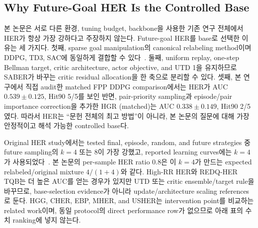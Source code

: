 \documentclass[letterpaper]{article}
\begin{document}
\subsection{Why Future-Goal HER Is the Controlled Base}

본 논문은 서로 다른 환경, tuning budget, backbone을 사용한 기존 연구 전체에서 HER가 항상 가장 강하다고 주장하지 않는다. Future-goal HER를 base로 선택한 이유는 세 가지다. 첫째, sparse goal manipulation의 canonical relabeling method이며 DDPG, TD3, SAC에 동일하게 결합할 수 있다~\citep{andrychowicz2017her}. 둘째, uniform replay, one-step Bellman target, critic architecture, actor objective, and UTD 1을 유지하므로 SABER가 바꾸는 critic residual allocation을 한 축으로 분리할 수 있다. 셋째, 본 연구에서 직접 audit한 matched FPP DDPG comparison에서는 HER가 AUC \(0.539\pm0.125\), Hit90 5/5를 보인 반면, pair-priority sampling과 episode/pair importance correction을 추가한 HGR (matched)는 AUC \(0.338\pm0.149\), Hit90 2/5였다. 따라서 HER는 ``문헌 전체의 최고 방법''이 아니라, 본 논문의 질문에 대해 가장 안정적이고 해석 가능한 controlled base다.

Original HER study에서는 tested final, episode, random, and future strategies 중 future sampling의 \(k=4\) 또는 8이 가장 강했고, reported learning curves에는 \(k=4\)가 사용되었다~\citep{andrychowicz2017her}. 본 논문의 per-sample HER ratio 0.8은 이 \(k=4\)가 만드는 expected relabeled/original mixture \(4/(1+4)\)와 같다. High-RR HER와 REDQ-HER TQB는 더 높은 AUC를 얻는 경우가 있지만 UTD 또는 critic ensemble/target rule을 바꾸므로, base-selection evidence가 아니라 update/architecture scaling references로 둔다. HGG, CHER, EBP, MHER, and USHER는 intervention point를 비교하는 related work이며, 동일 protocol의 direct performance row가 없으므로 아래 표의 수치 ranking에 넣지 않는다.
\end{document}
